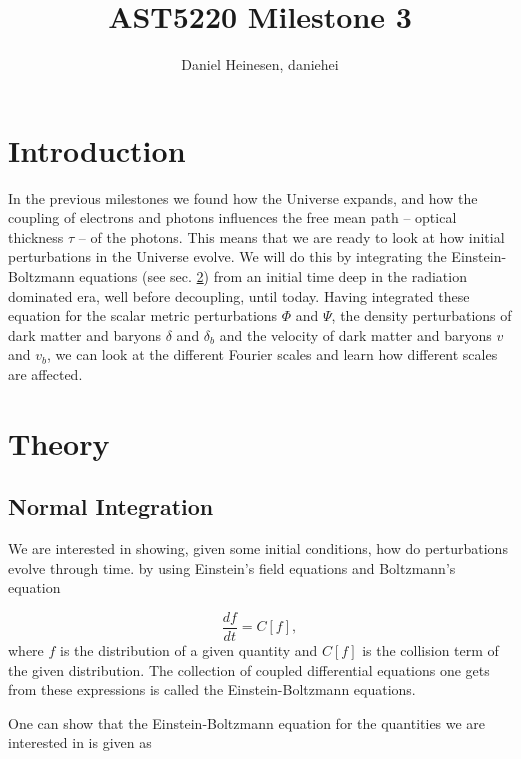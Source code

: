 \documentclass[a4paper,norsk, 10pt]{article}
\title{AST5220 Milestone 3}
\author{Daniel Heinesen, daniehei}
\begin{document}
\maketitle

\section{Introduction}
In the previous milestones we found how the Universe expands, and how the coupling of electrons and photons influences the free mean path -- optical thickness $\tau$ -- of the photons. This means that we are ready to look at how initial perturbations in the Universe evolve. We will do this by integrating the Einstein-Boltzmann equations (see sec. \ref{sec:theory}) from an initial time deep in the radiation dominated era, well before decoupling, until today. Having integrated these equation for the scalar metric perturbations $\Phi$ and $\Psi$, the density perturbations of dark matter and baryons $\delta$ and $\delta_b$ and the velocity of dark matter and baryons $v$ and $v_b$, we can look at the different Fourier scales and learn how different scales are affected.

\section{Theory}\label{sec:theory}

\subsection{Normal Integration}\label{sec:normal}
We are interested in showing, given some initial conditions, how do perturbations evolve through time. by using Einstein's field equations and Boltzmann's equation

\begin{equation}
\frac{df}{dt} = C[f],
\end{equation}
where $f$ is the distribution of a given quantity and $C[f]$ is the collision term of the given distribution. The collection of coupled differential equations one gets from these expressions is called the Einstein-Boltzmann equations.

One can show that the Einstein-Boltzmann equation for the quantities we are interested in is given as
\end{document}
